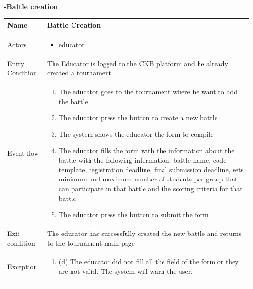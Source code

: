 \begin{enumerate}[label=\textbf{[UC\arabic*]}]
    \newpage
    \item \textbf{-Battle creation}
        \\ \begin{tabular}{|l|p{11cm}|}
        \hline
        Name & Battle Creation \\
        \hline
        Actors & \begin{itemize}
                    \item educator
                \end{itemize} \\
        \hline
        Entry Condition & The Educator is logged to the CKB platform and he already created a tournament\\
        \hline
        Event flow & \begin{enumerate}
            \item The educator goes to the tournament where he want to add the battle
            \item The educator press the button to create a new battle
            \item The system shows the educator the form to compile
            \item The educator fills the form with the information about the battle with the following information: battle name, code template, registration deadline, final submission deadline, sets minimum and maximum number of students per group that can participate in that battle and the scoring criteria for that battle
            \item The educator press the button to submit the form
        \end{enumerate}\\
        \hline
        Exit condition & The educator has successfully created the new battle and returns to the tournament main page \\
        \hline
        Exception & \begin{enumerate} [label={}, leftmargin=0.25cm ]
            \item (d) The educator did not fill all the field of the form or they are not valid. The system will warn the user. 
        \end{enumerate}\\
        \hline            
    \end{tabular}


\end{enumerate}
